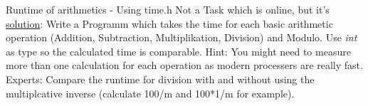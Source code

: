 \begin{frame}{Runtime of arithmetics - Using time.h}
    Not a Task which is online, but it's \href{https://github.com/scholzp/c-lessons/blob/master/solutions/Runtime/run_time.c}{solution}: \newline
    Write a Programm which takes the time for each basic arithmetic operation (Addition, Subtraction, Multiplikation, Division) and Modulo. Use \textit{int} 
    as type so the calculated time is comparable. 
    \newline
    \newline
    Hint: You might need to measure more than one calculation for each operation as modern processers are really fast.
    \newline 
    \newline
    Experts: Compare the runtime for division with and without using the multiplcative inverse (calculate 100/m and 100*1/m for example). 
\end{frame}

